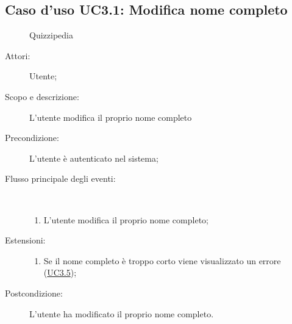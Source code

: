 \subsection{Caso d'uso UC3.1: Modifica nome completo}
	\begin{figure}[H]
		\centering
		\begin{resizedtikzpicture}{\textwidth}
		\begin{umlsystem}[x=0, fill=lightgray!20]{Quizzipedia}
		\end{umlsystem}
		\end{resizedtikzpicture}
		\caption{}
	\end{figure}
\begin{description}
\item[Attori:] Utente;
\item[Scopo e descrizione:] L'utente modifica il proprio nome completo
      \item[Precondizione:] L'utente è autenticato nel sistema;

        \item[Flusso principale degli eventi:] \ 
 \begin{enumerate}
          \item L’utente modifica il proprio nome completo;

      \end{enumerate}
    \item[Estensioni:]
      \begin{enumerate}
          \item Se il nome completo è troppo corto viene visualizzato un errore (\hyperlink{UC3.5}{UC3.5});

      \end{enumerate}
    \item[Postcondizione:] L'utente ha modificato il proprio nome completo.
  \end{description}
\hypertarget{UC3.2}{}
